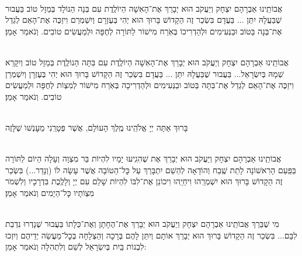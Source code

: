 \documentclass[twoside, openany, parskip=half, 11pt]{book}
\begin{document}
\begin{sometimes}



\\
אֲבוֹתֵֽינוּ אַבְרָהָם יִצְחָק וְיַעֲקֹב הוּא יְבָרֵךְ אֶת־הָאִשָׁה הַיוֹלֶֽדֶת
עִם בְּנָה הַנוֹלָד בְּמַזָל טוֹב בַּעֲבוּר שֶׁבַּעֲלָהּ יִתֵּן ... בַּעֲדָם בִּשְׂכַר זֶה הַקָדוֹשׁ בָּרוּךְ הוּא יְהִי בְּעֶזְרָם וְיִשְׁמְרֵם וִיזַכֶּה אֶת־הָאֵם לְגַדֵל אֶת־בְּנָה בַּטוֹב וּבַנְּעִימִים וּלְהַדְרִיכוֹ בְּאֹֽרַח מִישׁוֹר לַתּוֹרָה לְחֻפָּה וּלְמַעֲשִׂים טוֹבִים. וְנֹאמַר אָמֵן׃



\\
אֲבוֹתֵֽינוּ אַבְרָהָם יִצְחָק וְיַעֲקֹב הוּא יְבָרֵךְ אֶת־הָאִשָׁה הַיוֹלֶֽדֶת
עִם בִּתָּה הַנוֹלֶֽדֶת בְּמַזָל טוֹב וְיִקָרֵא שְׁמָהּ בְּיִשְׂרָאֵל... בַּעֲבוּר שֶׁבַּעֲלָהּ יִתֵּן ... בַּעֲדָם בִּשְׂכַר זֶה הַקָדוֹשׁ בָּרוּךְ הוּא יְהִי בְּעֶזְרָן וְיִשְׁמְרֵן וִיזַכֶּה אֶת־הָאֵם לְגַדֵל אֶת־בִּתָּה בַּטוֹב ובַנְּעִימִים וּלְהַדְרִיכָה בְּאֹֽרַח מִישׁוֹר לְמִצְוֹת לְחֻפָּה וּלְמַעֲשִׂים טוֹבִים. וְנֹאמַר אָמֵן׃

\\
בָּרוּךְ אַתָּה יְיָ אֱלֹהֵֽינוּ מֶֽלֶךְ הָעוֹלָם, אֲשֶׁר פְּטָרַֽנִי מֵעׇנְשׁוׂ שֶׁלָּזֶה

\\
אֲבוֹתֵֽינוּ אַבְרָהָם יִצְחָק וְיַעֲקֹב הוּא יְבָרֵךְ אֶת
שֶׁהִגִֽיעוּ יָמָיו לִהְיוֹת בַּר מִצְוָה וְעָלָה הַיוֹם לַתּוֹרָה בַּפַּֽעַם הָרִאשׁוֹנָה לָתֵת שֶֽׁבַח וְהוֹדָאָה לְהַשֵׁם יִתְבָּרַךְ עַל כׇּל־הַטוֹבָה אֲשֶׁר עָשָׂה לוֹ (וְנָדַר...) בִּשְׂכַר זֶה הַקָדוֹשׁ בָּרוּךְ הוּא יִשְׁמְרֵֽהוּ וִיחַיֵֽהוּ וִיכוֹנֵן אֶת־לִבּוֹ לִהְיוֹת שָׁלֵם עִם יְיָ וְלָלֶֽכֶת בִּדְרָכָיו וְלִשְׁמֹר מִצְוֹתָיו כׇּל־הַיָמִים וְנֹאמַר אָמֵן׃


\\
מִי שֶׁבֵּרַךְ אֲבוֹתֵֽינוּ אַבְרָהָם יִצְחָק וְיַעֲקֹב הוּא יְבָרֵךְ אֶת־הֶחָתָן  וְאֶת־כַּלָתוֹ בַּעֲבוּר שֶׁנָדְרוּ נִדְבַת לִבָּם... בִּשְׂכַר זֶה הַקָדוֹשׁ בָּרוּךְ הוּא יְבָרֵךְ אוֹתָם וְיִתֵּן לָהֶם בְּרָכָה וְהַצְלָחָה בְּכׇל־מַעֲשֵׂה יְדֵיהֶם וְיִזְכוּ לִבְנוֹת בַּֽיִת בְּיִשְׂרָאֵל לְשֵׁם וְלִתְהִלָה וְנֹאמַר אָמֵן:


\end{sometimes}
\end{document}
